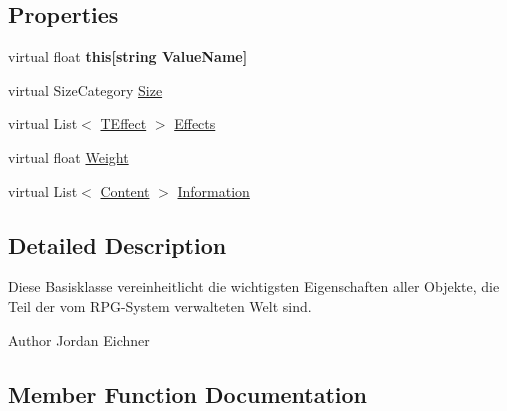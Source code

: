 \subsection*{Properties}
\begin{DoxyCompactItemize}
\item 
\hypertarget{class_r_p_g_object_a3d99b09e24d89cedff15b23fd6f64839}{}virtual float {\bfseries this\mbox{[}string Value\+Name\mbox{]}}\label{class_r_p_g_object_a3d99b09e24d89cedff15b23fd6f64839}

\item 
virtual Size\+Category \hyperlink{class_r_p_g_object_ad4fe72a3a4621618a563219805ede17d}{Size}
\item 
virtual List$<$ \hyperlink{class_t_effect}{T\+Effect} $>$ \hyperlink{class_r_p_g_object_ac13bdb9e5988e9eff18e5f6f5b613bb6}{Effects}
\item 
virtual float \hyperlink{class_r_p_g_object_af627383d88885ca597a549cb52e4b242}{Weight}
\item 
virtual List$<$ \hyperlink{struct_content}{Content} $>$ \hyperlink{class_r_p_g_object_a312d68adaf6a8eb15319d3cac8198802}{Information}
\end{DoxyCompactItemize}


\subsection{Detailed Description}
Diese Basisklasse vereinheitlicht die wichtigsten Eigenschaften aller Objekte, die Teil der vom R\+P\+G-\/\+System verwalteten Welt sind. 

\begin{DoxyAuthor}{Author}
Jordan Eichner 
\end{DoxyAuthor}


\subsection{Member Function Documentation}
\hypertarget{class_r_p_g_object_a7772162c56eed453f9f97b6ac01bc48b}{}
